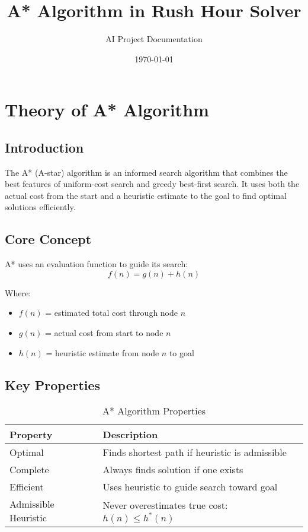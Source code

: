 \documentclass[12pt,a4paper]{article}
\title{A* Algorithm in Rush Hour Solver}
\author{AI Project Documentation}
\date{\today}
\begin{document}
\maketitle
\tableofcontents
\newpage

\section{Theory of A* Algorithm}

\subsection{Introduction}

The A* (A-star) algorithm is an informed search algorithm that combines the best features of uniform-cost search and greedy best-first search. It uses both the actual cost from the start and a heuristic estimate to the goal to find optimal solutions efficiently.

\subsection{Core Concept}

A* uses an evaluation function to guide its search:
\begin{equation}
f(n) = g(n) + h(n)
\end{equation}

Where:
\begin{itemize}
    \item $f(n)$ = estimated total cost through node $n$
    \item $g(n)$ = actual cost from start to node $n$
    \item $h(n)$ = heuristic estimate from node $n$ to goal
\end{itemize}

\subsection{Key Properties}

\begin{table}[h!]
\centering
\begin{tabular}{|l|p{6cm}|}
\hline
\textbf{Property} & \textbf{Description} \\
\hline
Optimal & Finds shortest path if heuristic is admissible \\
\hline
Complete & Always finds solution if one exists \\
\hline
Efficient & Uses heuristic to guide search toward goal \\
\hline
Admissible Heuristic & Never overestimates true cost: $h(n) \leq h^*(n)$ \\
\hline
\end{tabular}
\caption{A* Algorithm Properties}
\end{table}
\end{document}
